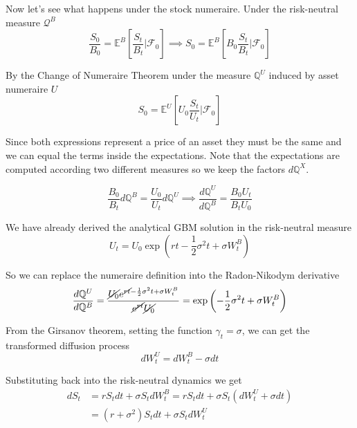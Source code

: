 \documentclass{beamer}
\begin{document}
\begin{frame}{}
Now let's see what happens under the stock numeraire.
Under the risk-neutral measure $\mathcal{Q}^B$
\begin{equation*}
\frac{S_0}{B_0} = \mathbb{E}^{B}\left[\frac{S_t}{B_t}\bigg|\mathcal{F}_0\right] \implies
S_0 = \mathbb{E}^{B}\left[B_0\frac{S_t}{B_t}\bigg|\mathcal{F}_0\right]
\end{equation*}

By the Change of Numeraire Theorem under the measure $\mathbb{Q}^U$ induced by asset numeraire $U$
\begin{equation*}
S_0 = \mathbb{E}^{U}\left[U_0\frac{S_t}{U_t}\bigg|\mathcal{F}_0\right]
\end{equation*}

Since both expressions represent a price of an asset they must be the same and we can equal the terms inside the expectations. Note that the expectations are computed according two different measures so we keep the factors $d\mathbb{Q}^X$. 

\begin{equation*}
\frac{B_0}{B_t}d\mathbb{Q}^B = \frac{U_0}{U_t}d\mathbb{Q}^U\implies \frac{d\mathbb{Q}^U}{d\mathbb{Q}^B}=\frac{B_0U_t}{B_tU_0}
\end{equation*}
\end{frame}

\begin{frame}{}
We have already derived the analytical GBM solution in the risk-neutral measure
\begin{equation*} 
U_t = U_0 \exp\left(rt-\frac{1}{2}\sigma^2 t + \sigma W^B_t\right)
\end{equation*}

So we can replace the numeraire definition into the Radon-Nikodym derivative
\begin{equation*}
\frac{d\mathbb{Q}^U}{d\mathbb{Q}^B}=\frac{\cancel{U_0}e^{\cancel{rt}-\frac{1}{2}\sigma^2 t + \sigma W^B_t}}{\cancel{e^{rt}}\cancel{U_0}}=\exp\left(-\frac{1}{2}\sigma^2 t + \sigma W^B_t\right)
\end{equation*}

From the Girsanov theorem, setting the function $\gamma_t = \sigma$, we can get the transformed diffusion process
\begin{equation*}
dW_t^U = dW_t^B - \sigma dt 
\end{equation*}

Substituting back into the risk-neutral dynamics we get
\begin{equation*}
\begin{aligned}
dS_t &= r S_t dt + \sigma S_t dW_t^B = 
rS_t dt + \sigma S_t (dW_t^U + \sigma dt) \\
& = \boxed{(r + \sigma^2)S_t dt + \sigma S_t dW^U_t}
\end{aligned}
\end{equation*}
\end{frame}
\end{document}

